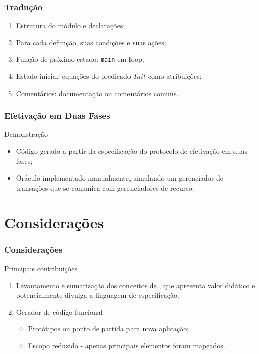 \documentclass{beamer}
\begin{document}
\begin{frame}
  \frametitle{Tradução}

  \begin{enumerate}
    \item Estrutura do módulo e declarações;

    \item Para cada definição, suas condições e suas ações;

    \item Função de próximo estado: \texttt{main} em loop;

    \item Estado inicial: equações do predicado $Init$ como atribuições;

    \item Comentários: documentação ou comentários comuns.

  \end{enumerate}
\end{frame}

\begin{frame}
  \frametitle{Efetivação em Duas Fases}
  \begin{block}{\Large Demonstração}\\
    \begin{itemize}
      \item Código gerado a partir da especificação do protocolo de efetivação em duas fases;\\
    \item
      Oráculo implementado manualmente, simulando um gerenciador de transações que se comunica com gerenciadores de recurso.
    \end{itemize}
  \end{block}
\end{frame}

\section{Considerações}

\begin{frame}
  \frametitle{Considerações}

  Principais contribuições
  \begin{enumerate}
    \item Levantamento e sumarização dos conceitos de \TLAA, que apresenta valor
      didático e potencialmente divulga a linguagem de especificação.
    \item Gerador de código funcional
      \begin{itemize}
        \item Protótipos ou ponto de partida para nova aplicação;
        \item Escopo reduzido - apenas principais elementos foram mapeados.
      \end{itemize}
  \end{enumerate}

\end{frame}
\end{document}
